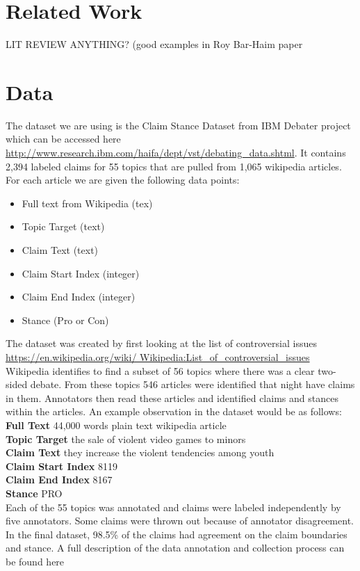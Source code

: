 \documentclass[11pt,a4paper]{article}
\begin{document}
\section{Related Work}
\cite{bar2017stance}
LIT REVIEW ANYTHING? (good examples in Roy Bar-Haim paper \\
\section{Data}
The dataset we are using is the Claim Stance Dataset from IBM Debater project which can be accessed here \url{http://www.research.ibm.com/haifa/dept/vst/debating_data.shtml}​.  It contains 2,394 labeled claims for 55 topics that are pulled from 1,065 wikipedia articles.  For each article we are given the following data points:

\begin{itemize}
\item Full text from Wikipedia (tex)
\item Topic Target (text)
\item Claim Text (text)
\item Claim Start Index (integer)
\item Claim End Index (integer)
\item Stance (Pro or Con)
\end{itemize}

The dataset was created by first looking at the list of controversial issues \url{https://en.wikipedia.org/wiki/
Wikipedia:List_of_controversial_issues} Wikipedia identifies to find a subset of 56 topics where there was a clear two-sided debate.  From these topics 546 articles were identified that night have claims in them.  Annotators then read these articles and identified claims and stances within the articles.  An example observation in the dataset would be as follows: \\
\textbf{Full Text} 44,000 words plain text wikipedia article\\
\textbf{Topic Target} the sale of violent video games to minors\\
\textbf{Claim Text} they increase the violent tendencies among youth\\
\textbf{Claim Start Index} 8119\\
\textbf{Claim End Index} 8167\\
\textbf{Stance} PRO\\
Each of the 55 topics was annotated and claims were labeled independently by five annotators.  Some claims were thrown out because of annotator disagreement.  In the final dataset, 98.5\% of the claims had agreement on the claim boundaries and stance.  A full description of the data annotation and collection process can be found here \cite{toledo2016expert}
\end{document}
